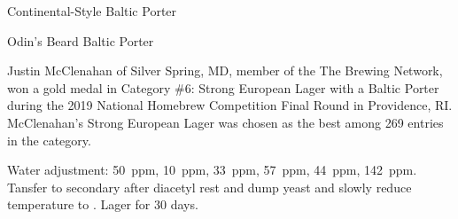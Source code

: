 \begin{recipie}{Continental-Style Baltic Porter}
\begin{ingredientsblock}
\begin{hops}
\end{hops}

\begin{yeasts}
\end{yeasts}

\end{ingredientsblock}

\begin{recipie}{Odin's Beard Baltic Porter}

\begin{aboutblock}
Justin McClenahan of Silver Spring, MD, member of the The Brewing Network, won a
gold medal in Category \#6: Strong European Lager with a Baltic Porter during the
2019 National Homebrew Competition Final Round in Providence, RI. McClenahan's
Strong European Lager was chosen as the best among 269 entries in the category.
\end{aboutblock}


\begin{methodandtiming}
 
\begin{mashsteps}
\end{mashsteps}

\begin{fermentationsteps}
\end{fermentationsteps}

\begin{directions}
Water adjustment:  50~ppm,  10~ppm,  33~ppm,  57~ppm,
 44~ppm,  142~ppm. Tansfer to secondary after diacetyl rest and
dump yeast and slowly reduce temperature to . Lager for 30 days.
\end{directions}

\end{methodandtiming}

\pagebreak


\end{recipie}
\end{recipie}
